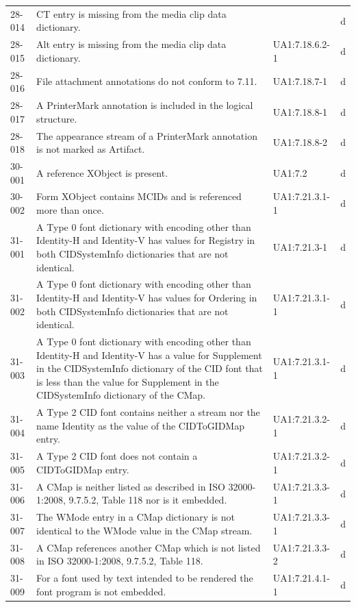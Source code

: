 \documentclass{book}
\begin{document}
\begin{tabular}{lp{5cm}lp{5cm}}
  28-014 & CT entry is missing from the media clip data dictionary. &  & d\\
  28-015 & Alt entry is missing from the media clip data dictionary. & UA1:7.18.6.2-1 & d\\
  28-016 & File attachment annotations do not conform to 7.11. & UA1:7.18.7-1 & d\\
  28-017 & A PrinterMark annotation is included in the logical structure. & UA1:7.18.8-1 & d\\
  28-018 & The appearance stream of a PrinterMark annotation is not marked as Artifact. & UA1:7.18.8-2 & d\\
  30-001 & A reference XObject is present. & UA1:7.2 & d\\
  30-002 & Form XObject contains MCIDs and is referenced more than once. & UA1:7.21.3.1-1 &  d\\
  31-001 & A Type 0 font dictionary with encoding other than Identity-H and Identity-V has values for Registry in both CIDSystemInfo dictionaries that are not identical. & UA1:7.21.3-1 & d\\
  31-002 & A Type 0 font dictionary with encoding other than Identity-H and Identity-V has values for Ordering in both CIDSystemInfo dictionaries that are not identical. & UA1:7.21.3.1-1 & d\\
  31-003 & A Type 0 font dictionary with encoding other than Identity-H and Identity-V has a value for Supplement in the CIDSystemInfo dictionary of the CID font that is less than the value for Supplement in the CIDSystemInfo dictionary of the CMap. & UA1:7.21.3.1-1 & d\\
  31-004 & A Type 2 CID font contains neither a stream nor the name Identity as the value of the CIDToGIDMap entry. & UA1:7.21.3.2-1 & d\\
  31-005 & A Type 2 CID font does not contain a CIDToGIDMap entry. & UA1:7.21.3.2-1 & d\\
  31-006 & A CMap is neither listed as described in ISO 32000- 1:2008, 9.7.5.2, Table 118 nor is it embedded. & UA1:7.21.3.3-1 & d\\
  31-007 & The WMode entry in a CMap dictionary is not identical to the WMode value in the CMap stream. & UA1:7.21.3.3-1 & d\\
  31-008 & A CMap references another CMap which is not listed in ISO 32000-1:2008, 9.7.5.2, Table 118. & UA1:7.21.3.3-2 & d\\
  31-009 & For a font used by text intended to be rendered the font program is not embedded. & UA1:7.21.4.1-1 & d\\

\end{tabular}
\end{document}
